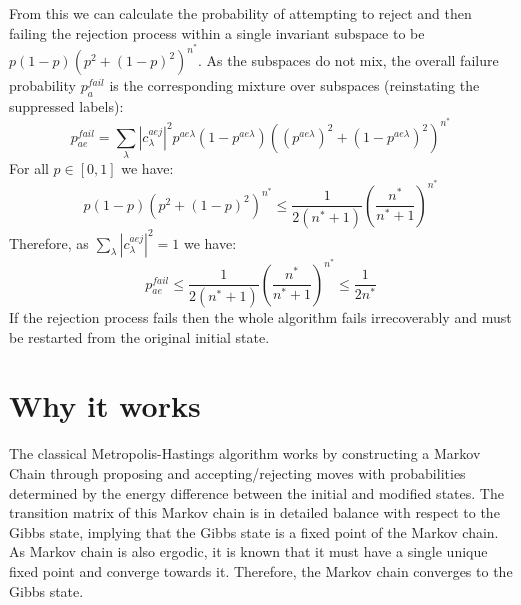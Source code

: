 \documentclass[aps,floatfix,10pt,amssymb,amsfont,amsmath,superscriptaddress,float,nofootinbib,longbibliography,nobalancelastpage,twocolumn]{revtex4-2}
\begin{document}
From this we can calculate the probability of attempting to reject and then failing the rejection process within a single invariant subspace to be $p(1-p)(p^2 +(1-p)^2)^{n^*}$. As the subspaces do not mix, the overall failure probability $p_a^{fail}$ is the corresponding mixture over subspaces (reinstating the suppressed labels):
\begin{equation}
   p_{ae}^{fail} =  \sum_{\lambda}|c^{aej}_{\lambda}|^2p^{ae\lambda}(1-p^{ae\lambda})((p^{ae\lambda})^2 +(1-p^{ae\lambda})^2)^{n^*}
\end{equation}
For all $p \in [0,1]$ we have: 
\begin{equation}
    p(1-p)(p^2 +(1-p)^2)^{n^*} \leq \frac{1}{2(n^*+1)} \left(\frac{n^*}{n^*+1}\right)^{n^*}
\end{equation}
Therefore, as $\sum_{\lambda}|c^{aej}_{\lambda}|^2=1$ we have:
\begin{equation}
    \label{eq:probabilty_of_rejection}
   p_{ae}^{fail} \leq \frac{1}{2(n^*+1)} \left(\frac{n^*}{n^*+1}\right)^{n^*} \leq \frac{1}{2n^*}
\end{equation}
If the rejection process fails then the whole algorithm fails irrecoverably and must be restarted from the original initial state.

\label{section:rejection}

\section{Why it works}
\label{section:why}
The classical Metropolis-Hastings algorithm works by constructing a Markov Chain through proposing and accepting/rejecting moves with probabilities determined by the energy difference between the initial and modified states. The transition matrix of this Markov chain is in detailed balance with respect to the Gibbs state, implying that the Gibbs state is a fixed point of the Markov chain. As Markov chain is also ergodic, it is known that it must have a single unique fixed point and converge towards it. Therefore, the Markov chain converges to the Gibbs state.
\end{document}
